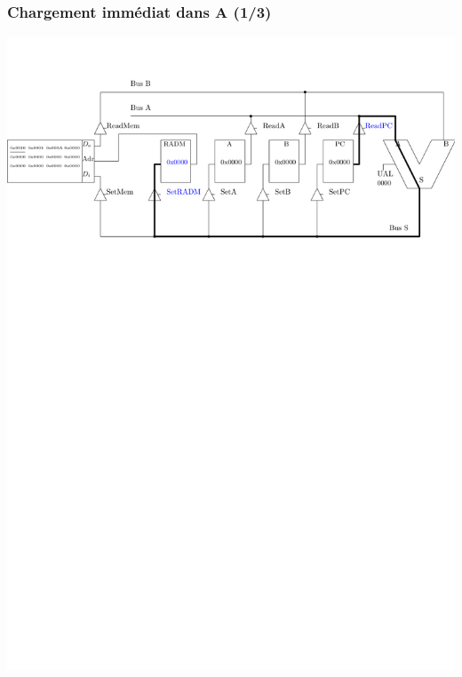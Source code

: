 \documentclass{beamer}
\begin{document}
\begin{frame}
\frametitle{Chargement immédiat dans A (1/3)}
\centering\includegraphics[width=\linewidth]{Figs/premier_chemin_lda_1.pdf}
\end{frame}
\end{document}
